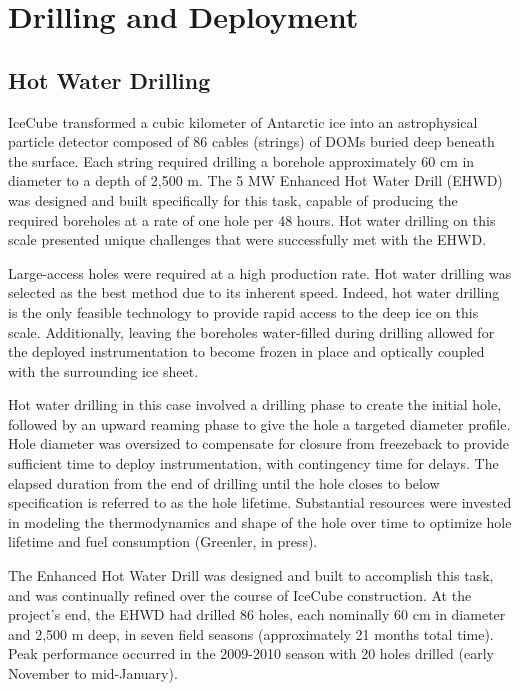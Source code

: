 
\section{Drilling and Deployment}

\subsection{Hot Water Drilling}

IceCube transformed a cubic kilometer of Antarctic ice into an astrophysical particle detector composed of 86 cables (strings) of DOMs buried deep beneath the surface.  Each string required drilling a borehole approximately 60 cm in diameter to a depth of 2,500 m.  The 5 MW Enhanced Hot Water Drill (EHWD) was designed and built specifically for this task, capable of producing the required boreholes at a rate of one hole per 48 hours. Hot water drilling on this scale presented unique challenges that were successfully met with the EHWD.

Large-access holes were required at a high production rate.  Hot water drilling was selected as the best method due to its inherent speed.  Indeed, hot water drilling is the only feasible technology to provide rapid access to the deep ice on this scale.  Additionally, leaving the boreholes water-filled during drilling allowed for the deployed instrumentation to become frozen in place and optically coupled with the surrounding ice sheet.
 
Hot water drilling in this case involved a drilling phase to create the initial hole, followed by an upward reaming phase to give the hole a targeted diameter profile.  Hole diameter was oversized to compensate for closure from freezeback to provide sufficient time to deploy instrumentation, with contingency time for delays.  The elapsed duration from the end of drilling until the hole closes to below specification is referred to as the hole lifetime.  Substantial resources were invested in modeling the thermodynamics and shape of the hole over time to optimize hole lifetime and fuel consumption (Greenler, in press).

The Enhanced Hot Water Drill was designed and built to accomplish this task, and was continually refined over the course of IceCube construction.  At the project’s end, the EHWD had drilled 86 holes, each nominally 60 cm in diameter and 2,500 m deep, in seven field seasons (approximately 21 months total time).  Peak performance occurred in the 2009-2010 season with 20 holes drilled (early November to mid-January).  

